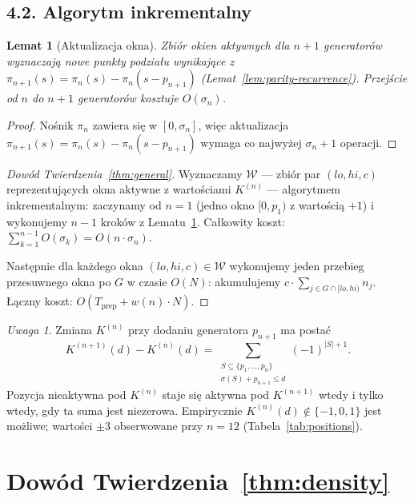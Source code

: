 \documentclass[11pt,a4paper]{amsart}
\theoremstyle{plain}
\newtheorem{lemma}[theorem]{Lemat}
\theoremstyle{definition}
\theoremstyle{remark}
\newtheorem{remark}[theorem]{Uwaga}
\begin{document}
\subsection*{4.2. Algorytm inkrementalny}

\begin{lemma}[Aktualizacja okna]
\label{lem:incremental}
Zbiór okien aktywnych dla $n+1$ generatorów wyznaczają
nowe punkty podziału wynikające z $\pi_{n+1}(s) = \pi_n(s) - \pi_n(s - p_{n+1})$
(Lemat~\ref{lem:parity-recurrence}).
Przejście od $n$ do $n+1$ generatorów kosztuje $O(\sigma_n)$.
\end{lemma}

\begin{proof}
Nośnik $\pi_n$ zawiera się w $[0, \sigma_n]$, więc
aktualizacja $\pi_{n+1}(s) = \pi_n(s) - \pi_n(s - p_{n+1})$
wymaga co najwyżej $\sigma_n + 1$ operacji.
\end{proof}

\begin{proof}[Dowód Twierdzenia~\ref{thm:general}]
Wyznaczamy $\mathcal{W}$ --- zbiór par $(lo, hi, c)$ reprezentujących
okna aktywne z wartościami $K^{(n)}$ --- algorytmem inkrementalnym:
zaczynamy od $n = 1$ (jedno okno $[0, p_1)$ z wartością $+1$)
i wykonujemy $n-1$ kroków z Lematu~\ref{lem:incremental}.
Całkowity koszt: $\sum_{k=1}^{n-1} O(\sigma_k) = O(n \cdot \sigma_n)$.

Następnie dla każdego okna $(lo, hi, c) \in \mathcal{W}$
wykonujemy jeden przebieg przesuwnego okna po $G$ w czasie $O(N)$:
akumulujemy $c \cdot \sum_{j \in G \cap [lo, hi)} n_j$.
Łączny koszt: $O(T_{\mathrm{prep}} + w(n) \cdot N)$.
\end{proof}

\begin{remark}
\label{rem:activation}
Zmiana $K^{(n)}$ przy dodaniu generatora $p_{n+1}$ ma postać
\[
  K^{(n+1)}(d) - K^{(n)}(d) =
  \sum_{\substack{S \subseteq \{p_1,\ldots,p_n\} \\ \sigma(S)+p_{n+1} \leq d}}
  (-1)^{|S|+1}.
\]
Pozycja nieaktywna pod $K^{(n)}$ staje się aktywna pod $K^{(n+1)}$
wtedy i tylko wtedy, gdy ta suma jest niezerowa.
Empirycznie $K^{(n)}(d) \notin \{-1, 0, 1\}$ jest możliwe;
wartości $\pm 3$ obserwowane przy $n = 12$
(Tabela~\ref{tab:positions}).
\end{remark}

\section{Dowód Twierdzenia~\ref{thm:density}}
\label{sec:proof-density}
\end{document}
